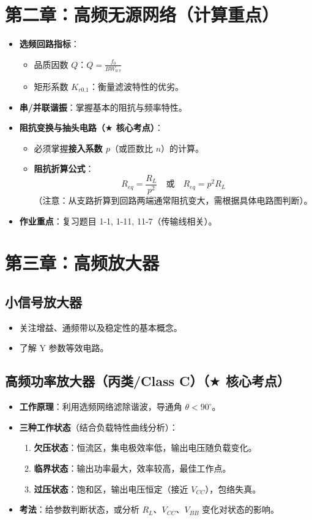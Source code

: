\documentclass[a4paper,12pt]{ctexart}
\begin{document}
	\section{第二章：高频无源网络（计算重点）}
	\begin{itemize}
		\item \textbf{选频回路指标}：
		\begin{itemize}
			\item 品质因数 $Q$：$Q = \frac{f_0}{BW_{0.7}}$
			\item 矩形系数 $K_{r0.1}$：衡量滤波特性的优劣。
		\end{itemize}
		\item \textbf{串/并联谐振}：掌握基本的阻抗与频率特性。
		\item \textbf{阻抗变换与抽头电路（$\bigstar$ 核心考点）}：
		\begin{itemize}
			\item 必须掌握\textbf{接入系数 $p$}（或匝数比 $n$）的计算。
			\item \textbf{阻抗折算公式}：
			\[ R_{eq} = \frac{R_L}{p^2} \quad \text{或} \quad R_{eq} = p^2 R_L \]
			（注意：从支路折算到回路两端通常阻抗变大，需根据具体电路图判断）。
		\end{itemize}
		\item \textbf{作业重点}：复习题目 1-1, 1-11, 11-7（传输线相关）。
	\end{itemize}

	\section{第三章：高频放大器}
	\subsection{小信号放大器}
	\begin{itemize}
		\item 关注增益、通频带以及稳定性的基本概念。
		\item 了解 Y 参数等效电路。
	\end{itemize}

	\subsection{高频功率放大器（丙类/Class C）（$\bigstar$ 核心考点）}
	\begin{itemize}
		\item \textbf{工作原理}：利用选频网络滤除谐波，导通角 $\theta < 90^\circ$。
		\item \textbf{三种工作状态}（结合负载特性曲线分析）：
		\begin{enumerate}
			\item \textbf{欠压状态}：恒流区，集电极效率低，输出电压随负载变化。
			\item \textbf{临界状态}：输出功率最大，效率较高，最佳工作点。
			\item \textbf{过压状态}：饱和区，输出电压恒定（接近 $V_{CC}$），包络失真。
		\end{enumerate}
		\item \textbf{考法}：给参数判断状态，或分析 $R_L$、$V_{CC}$、$V_{BB}$ 变化对状态的影响。
	\end{itemize}
\end{document}
